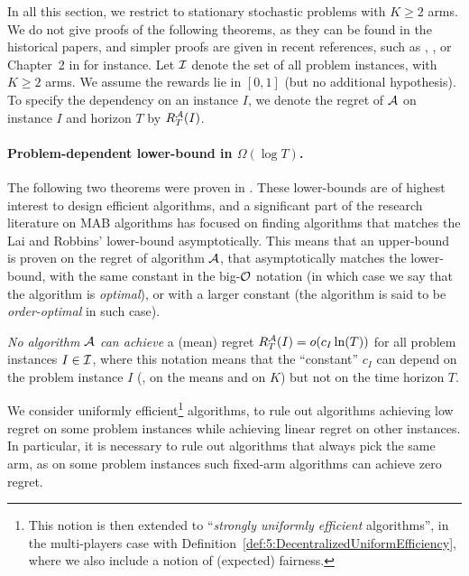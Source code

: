 In all this section, we restrict to stationary stochastic problems with $K\geq2$ arms.
We do not give proofs of the following theorems, as they can be found in the historical papers, and simpler proofs are given in recent references, such as \cite{Bubeck12}, \cite{LattimoreBanditAlgorithmsBook}, or Chapter~2 in \cite{Slivkins2019} for instance.
%
Let $\mathcal{I}$ denote the set of all problem instances, with $K \geq 2$ arms. We assume the rewards lie in $[0,1]$ (but no additional hypothesis).
To specify the dependency on an instance $I$, we denote the regret of $\mathcal{A}$ on instance $I$ and horizon $T$ by $R_T^{\mathcal{A}}(I)$.


\paragraph{Problem-dependent lower-bound in $\Omega(\log T)$.}
%
The following two theorems were proven in \cite{LaiRobbins85}.
These lower-bounds are of highest interest to design efficient algorithms,
and a significant part of the research literature on MAB algorithms has focused on finding algorithms that matches the Lai and Robbins' lower-bound asymptotically.
This means that an upper-bound is proven on the regret of algorithm $\mathcal{A}$, that asymptotically matches the lower-bound, with the same constant in the big-$\mathcal{O}$ notation (in which case we say that the algorithm is \emph{optimal}), or with a larger constant (the algorithm is said to be \emph{order-optimal} in such case).


\begin{theorem}\label{thm:2:firstLogTLowerBound}
\begin{leftbar}[theorembar]  %
    \emph{No algorithm $\mathcal{A}$ can achieve} a (mean) regret $R_T^{\mathcal{A}}(I) = \mathop{}\mathopen{}o\mathopen{}\left(c_I \ln(T)\right)$ for all problem instances $I \in \mathcal{I}$,
    where this notation means that the ``constant'' $c_I$ can depend on the problem instance $I$ (\eg, on the means and on $K$) but not on the time horizon $T$.
\end{leftbar}  %
\end{theorem}

We consider uniformly efficient\footnote{This notion is then extended to ``\emph{strongly uniformly efficient} algorithms'', in the multi-players case with Definition~\ref{def:5:DecentralizedUniformEfficiency}, where we also include a notion of (expected) fairness.} algorithms, to rule out algorithms achieving low regret on some problem instances while achieving linear regret on other instances.
In particular, it is necessary to rule out algorithms that always pick the same arm, as on some problem instances such fixed-arm algorithms can achieve zero regret.

